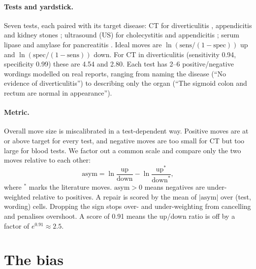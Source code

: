 \documentclass[10pt]{article}
\newcommand{\asym}{\mathrm{asym}}
\begin{document}
\paragraph{Tests and yardstick.} Seven tests, each paired with its target disease: CT for diverticulitis \citep{lameris2008diverticulitis}, appendicitis and kidney stones \citep{lit_ct_stone}; ultrasound (US) for cholecystitis \citep{lit_us_gallbladder} and appendicitis \citep{lit_us_appendix}; serum lipase and amylase for pancreatitis \citep{lit_amylase}. Ideal moves are $\ln(\text{sens}/(1-\text{spec}))$ up and $\ln(\text{spec}/(1-\text{sens}))$ down. For CT in diverticulitis (sensitivity 0.94, specificity 0.99) these are 4.54 and 2.80. Each test has 2--6 positive/negative wordings modelled on real reports, ranging from naming the disease (``No evidence of diverticulitis'') to describing only the organ (``The sigmoid colon and rectum are normal in appearance'').

\paragraph{Metric.} Overall move size is miscalibrated in a test-dependent way. Positive moves are at or above target for every test, and negative moves are too small for CT but too large for blood tests. We factor out a common scale and compare only the two moves relative to each other:
\begin{equation}
\asym = \ln\frac{\mathrm{up}}{\mathrm{down}} - \ln\frac{\mathrm{up}^{*}}{\mathrm{down}^{*}},
\end{equation}
where $^{*}$ marks the literature moves. $\asym > 0$ means negatives are under-weighted relative to positives. A repair is scored by the mean of $|\asym|$ over (test, wording) cells. Dropping the sign stops over- and under-weighting from cancelling and penalises overshoot. A score of 0.91 means the up/down ratio is off by a factor of $e^{0.91}\approx 2.5$.

\section{The bias}\label{sec:bias}
\end{document}
